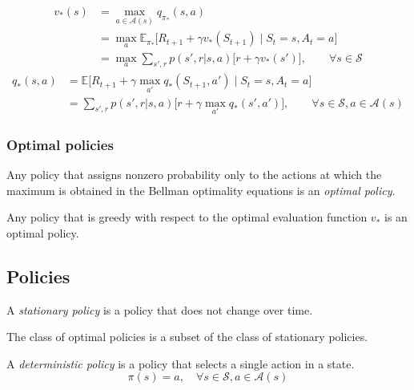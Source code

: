 \begin{equation}
    \begin{aligned}
        v_*(s)
         & =
        \max_{a \in \mathcal{A}(s)} q_{\pi_*}(s, a)
        \\ & =
        \max_{a} \mathbb{E}_{\pi_*} \big[ R_{t+1} + \gamma v_*(S_{t+1}) \;\big|\; S_t = s, A_t = a \big]
        \\ & =
        \max_{a} \sum_{s', r} p(s', r | s, a) \Big[ r + \gamma v_*(s') \Big]
        , \qquad \forall s \in \mathcal{S}
    \end{aligned}
\end{equation}
\begin{equation}
    \begin{aligned}
        q_*(s, a)
         & =
        \mathbb{E} \big[ R_{t+1} + \gamma \max_{a'} q_*(S_{t+1}, a') \;\big|\; S_t = s, A_t = a \big]
        \\ & =
        \sum_{s', r} p(s', r | s, a) \Big[ r + \gamma \max_{a'} q_*(s', a') \Big]
        , \qquad \forall s \in \mathcal{S}, a \in \mathcal{A}(s)
    \end{aligned}
\end{equation}

\subsubsection{Optimal policies}

Any policy that assigns nonzero probability only to the actions at which the maximum is obtained in the Bellman optimality equations is an \textit{optimal policy}.

Any policy that is greedy with respect to the
optimal evaluation function \( v_* \) is an optimal policy.

\subsection{Policies}\label{sec:policies}

A \textit{stationary policy} is a policy that does not change over time.

The class of optimal policies is a subset of the class of stationary policies.

A \textit{deterministic policy} is a policy that selects a single action in a state.
\begin{equation}
    \pi(s) = a, \quad \forall s \in \mathcal{S}, a \in \mathcal{A}(s)
\end{equation}

